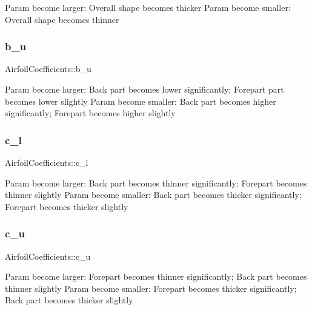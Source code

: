 Param become larger\+: Overall shape becomes thicker Param become smaller\+: Overall shape becomes thinner \hypertarget{struct_airfoil_coefficients_aaa3ac1f49bc08223607d6ac4864baaae}{}\label{struct_airfoil_coefficients_aaa3ac1f49bc08223607d6ac4864baaae} 
\subsubsection{\texorpdfstring{b\+\_\+u}{b\_u}}
{\footnotesize\ttfamily Airfoil\+Coefficients\+::b\+\_\+u}

Param become larger\+: Back part becomes lower significantly; Forepart part becomes lower slightly Param become smaller\+: Back part becomes higher significantly; Forepart becomes higher slightly \hypertarget{struct_airfoil_coefficients_aadd3f8683942976ea04c91b2afef18ad}{}\label{struct_airfoil_coefficients_aadd3f8683942976ea04c91b2afef18ad} 
\subsubsection{\texorpdfstring{c\+\_\+l}{c\_l}}
{\footnotesize\ttfamily Airfoil\+Coefficients\+::c\+\_\+l}

Param become larger\+: Back part becomes thinner significantly; Forepart becomes thinner slightly Param become smaller\+: Back part becomes thicker significantly; Forepart becomes thicker slightly \hypertarget{struct_airfoil_coefficients_a89bcbee889a35e1a184014b750195b37}{}\label{struct_airfoil_coefficients_a89bcbee889a35e1a184014b750195b37} 
\subsubsection{\texorpdfstring{c\+\_\+u}{c\_u}}
{\footnotesize\ttfamily Airfoil\+Coefficients\+::c\+\_\+u}

Param become larger\+: Forepart becomes thinner significantly; Back part becomes thinner slightly Param become smaller\+: Forepart becomes thicker significantly; Back part becomes thicker slightly \hypertarget{struct_airfoil_coefficients_abc1b88aeefdc2659a2585532a426279f}{}\label{struct_airfoil_coefficients_abc1b88aeefdc2659a2585532a426279f} 

